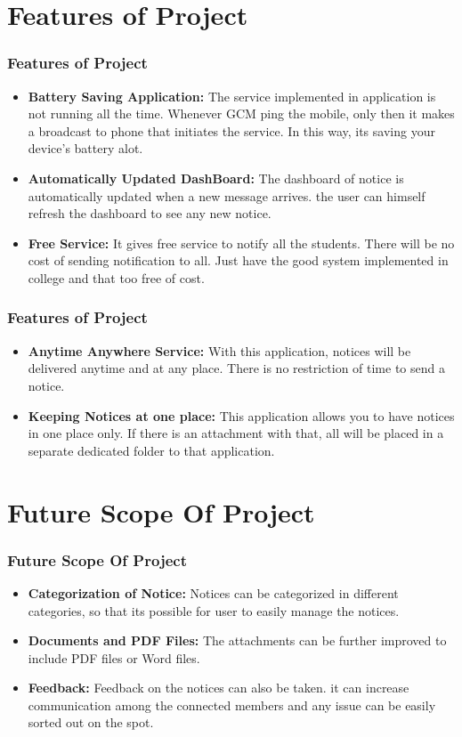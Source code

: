 \documentclass{beamer}   %
\begin{document}
\section{Features of Project}
\begin{frame}
\frametitle{Features of Project}
\begin{itemize}
\item \textbf{Battery Saving Application:} The service implemented in application is not running all the time. Whenever GCM ping the mobile, only then it makes a broadcast to phone that initiates the service. In this way, its saving your device's battery alot.\pause

\item \textbf{Automatically Updated DashBoard:} The dashboard of notice is automatically updated when a new message arrives. the user can himself refresh the dashboard to see any new notice.\pause

\item \textbf{Free Service:} It gives free service to notify all the students. There will be no cost of sending notification to all.
Just have the good system implemented in college and that too free of cost. \pause
\end{itemize}
\end{frame}

\begin{frame}
\frametitle{Features of Project}
\begin{itemize}
\item \textbf{Anytime Anywhere Service:} With this application, notices will be delivered anytime and at any place. There is no restriction of time to send a notice. \pause

\item \textbf{Keeping Notices at one place:} This application allows you to have notices in one place only. If there is an attachment with that, all will be placed in a separate dedicated folder to that application.
\end{itemize}
\end{frame}

\section{Future Scope Of Project}
\begin{frame}
\frametitle{Future Scope Of Project}
\begin{itemize}
\item \textbf{Categorization of Notice:} Notices can be categorized in different categories, so that its possible for user to easily manage the notices.

\item \textbf{Documents and PDF Files:} The attachments can be further improved to include PDF files or Word files.

\item \textbf{Feedback:} Feedback on the notices can also be taken. it can increase communication among the connected members and any issue can be easily sorted out on the spot.
\end{itemize}
\end{frame}
\end{document}
